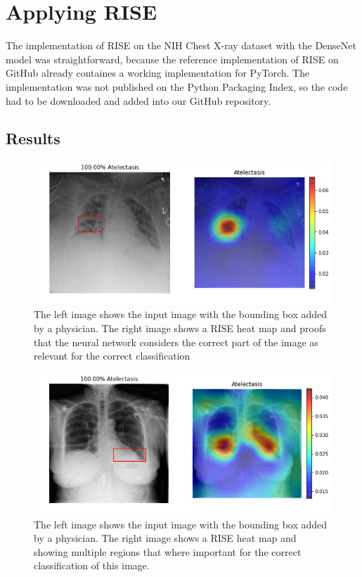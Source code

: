 \section{Applying RISE}

The implementation of RISE on the NIH Chest X-ray dataset with the DenseNet model was straightforward, because the reference implementation of RISE on GitHub \cite{risegithub} already
containes a working implementation for PyTorch. The implementation was not published on the Python Packaging Index, so the code had to be downloaded and added into our GitHub repository.

\subsection{Results}
\begin{figure}[H]
\centering
\includegraphics[width=12cm]{chapters/03_classification/images/rise_0.png}
\caption{The left image shows the input image with the bounding box added by a physician. The right image shows a RISE heat map and proofs that the neural network considers the correct part of the image as relevant for the correct classification}
\label{rise_example_1}
\end{figure}

\begin{figure}[H]
\centering
\includegraphics[width=12cm]{chapters/03_classification/images/rise_2.png}
\caption{The left image shows the input image with the bounding box added by a physician. The right image shows a RISE heat map and showing multiple regions that where important for the correct classification of this image.}
\label{rise_example_2}
\end{figure}

